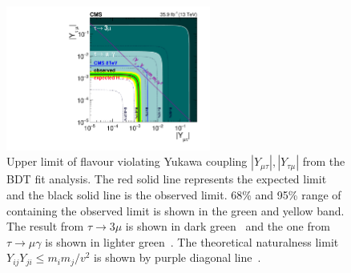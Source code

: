 \begin{figure}[htpb]
\begin{center}
\includegraphics[width=0.6\textwidth]{chapter8/yukawaMuon_dark.pdf}
\end{center}
\caption{Upper limit of flavour violating Yukawa coupling $|Y_{\mu\tau}|, |Y_{\tau\mu}|$ from the BDT fit analysis. The red solid line represents the expected limit and the black solid line is the observed limit. 68\% and 95\% range of containing the observed limit is shown in the green and yellow band. The result from $\tau \to 3 \mu$ is shown in dark green~\cite{Hayasaka:2010np,Olive:2016xmw,Harnik:2012pb} and the one from $\tau \to \mu\gamma$ is shown in lighter green~\cite{Olive:2016xmw,Harnik:2012pb}. The theoretical naturalness limit $Y_{ij}Y_{ji} \leq m_im_j/v^2$ is shown by purple diagonal line~\cite{Harnik:2012pb}.}

\label{fig:Yukawas}
\end{figure}









